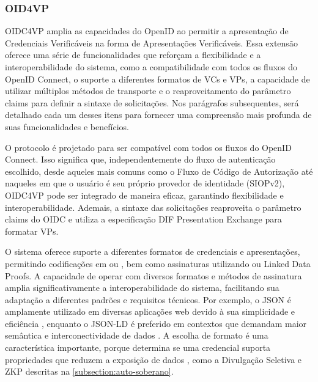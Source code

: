 

\subsubsection{OID4VP}\label{subsubsection:oidc4vp}

\acs{OIDC4VP} amplia as capacidades do OpenID ao permitir a apresentação de Credenciais Verificáveis na forma de Apresentações Verificáveis. Essa extensão oferece uma série de funcionalidades que reforçam a flexibilidade e a interoperabilidade do sistema, como a compatibilidade com todos os fluxos do OpenID Connect, o suporte a diferentes formatos de \acs{VC}s e \acs{VP}s, a capacidade de utilizar múltiplos métodos de transporte e o reaproveitamento do parâmetro claims para definir a sintaxe de solicitações. Nos parágrafos subsequentes, será detalhado cada um desses itens para fornecer uma compreensão mais profunda de suas funcionalidades e benefícios.

O protocolo é projetado para ser compatível com todos os fluxos do OpenID Connect. Isso significa que, independentemente do fluxo de autenticação escolhido, desde aqueles mais comuns como o Fluxo de Código de Autorização até naqueles em que o usuário é seu próprio provedor de identidade (\acs{SIOPv2}), \acs{OIDC4VP} pode ser integrado de maneira eficaz, garantindo flexibilidade e interoperabilidade.  Ademais, a sintaxe das solicitações reaproveita o parâmetro claims do \acs{OIDC} e utiliza a especificação DIF Presentation Exchange \cite{presentation-exchange} para formatar \acs{VP}s. 

O sistema oferece suporte a diferentes formatos de credenciais e apresentações, permitindo codificações em  ou , bem como assinaturas utilizando  ou Linked Data Proofs. A capacidade de operar com diversos formatos e métodos de assinatura amplia significativamente a interoperabilidade do sistema, facilitando sua adaptação a diferentes padrões e requisitos técnicos. Por exemplo, o \acs{JSON} é amplamente utilizado em diversas aplicações web devido à sua simplicidade e eficiência \cite{JSONrfc82592017}, enquanto o \acs{JSON-LD} é preferido em contextos que demandam maior semântica e interconectividade de dados \cite{jsonld112020}. A escolha de formato é uma característica importante, porque determina se uma credencial suporta propriedades que reduzem a exposição de dados \cite{OIDC4CI2023Authlete}, como a Divulgação Seletiva e \acs{ZKP} descritas na \autoref{subsection:auto-soberano}.


